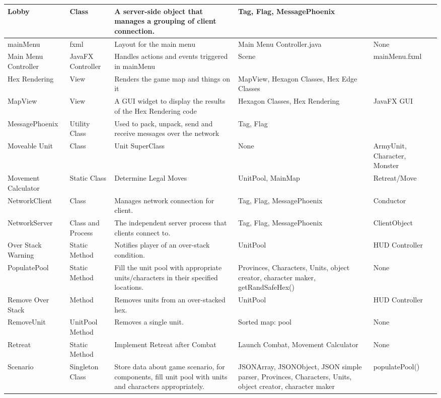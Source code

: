 \documentclass[12pt,a4paper,titlepage]{article}
\begin{document}
{\begin{center}
\begin{tabularx}{\linewidth}{|X|X|p{2in}|X|X|}
\hline
Lobby & Class & A server-side object that manages a grouping of client connection. & Tag, Flag, MessagePhoenix & \\ 
\hline
mainMenu & fxml & Layout for the main menu & Main Menu Controller.java & None\\
\hline
Main Menu Controller & JavaFX Controller & Handles actions and events triggered in mainMenu  & Scene & mainMenu.fxml\\
\hline
Hex Rendering & View & Renders the game map and things on it & MapView, Hexagon Classes, Hex Edge Classes & \\
\hline
MapView & View & A GUI widget to display the results of the Hex Rendering code & Hexagon Classes, Hex Rendering &
JavaFX GUI \\
\hline
MessagePhoenix & Utility Class & Used to pack, unpack, send and receive messages over the network & Tag, Flag & \\
\hline
Moveable Unit & Class & Unit SuperClass & None & ArmyUnit, Character, Monster\\
\hline
Movement Calculator & Static Class & Determine Legal Moves & UnitPool, MainMap & Retreat/Move\\
\hline
NetworkClient & Class & Manages network connection for client. & Tag, Flag, MessagePhoenix & Conductor \\
\hline
NetworkServer & Class and Process & The independent server process that clients connect to. & Tag, Flag, MessagePhoenix & ClientObject\\
\hline
Over Stack Warning & Static Method & Notifies player of an over-stack condition. & UnitPool & HUD Controller\\
\hline
PopulatePool & Static Method & Fill the unit pool with appropriate units/characters in their specified locations. & Provinces, Characters, Units, object creator, character maker, getRandSafeHex() & None \\
\hline
Remove Over Stack & Method & Removes units from an over-stacked hex. & UnitPool & HUD Controller\\
\hline
RemoveUnit & UnitPool Method & Removes a single unit. & Sorted map: pool & None\\
\hline
Retreat & Static Method & Implement Retreat after Combat & Launch Combat, Movement Calculator & None\\
\hline
Scenario & Singleton Class & Store data about game scenario, for components, fill unit pool with units and characters appropriately. & JSONArray, JSONObject, JSON simple parser, Provinces, Characters, Units, object creator, character maker & populatePool() \\

\end{tabularx}
\end{center}}
\end{document}
